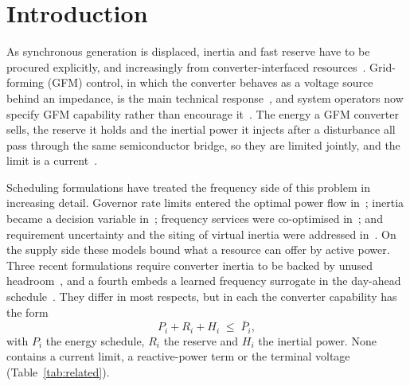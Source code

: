 
\section{Introduction}
\label{sec:intro}

As synchronous generation is displaced, inertia and fast reserve have to be
procured explicitly, and increasingly from converter-interfaced
resources~\cite{ulbig2014inertia,tielens2016inertia,milano2018lowinertia}.
Grid-forming (GFM) control, in which the converter behaves as a voltage source
behind an impedance, is the main technical
response~\cite{zhong2011synchronverter,rocabert2012control,dorfler2023control},
and system operators now specify GFM capability rather than encourage
it~\cite{matevosyan2019gfm,lin2020roadmap,entsoe2020gfm}. The energy a GFM
converter sells, the reserve it holds and the inertial power it injects after
a disturbance all pass through the same semiconductor bridge, so they are
limited jointly, and the limit is a current~\cite{yazdani2010vsc}.

Scheduling formulations have treated the frequency side of this problem in
increasing detail. Governor rate limits entered the optimal power flow
in~\cite{chavez2014governor}; inertia became a decision variable
in~\cite{teng2016stochastic}; frequency services were
co-optimised in~\cite{badesa2019simultaneous,trovato2019unit}; and
requirement uncertainty and the siting of virtual inertia were addressed
in~\cite{paturet2020stochastic,poolla2019placement}. On the supply side these
models bound what a resource can offer by active power. Three recent
formulations require converter inertia to be backed by unused
headroom~\cite{park2026inertia,jiang2025frequency,beigifard2026frequency},
and a fourth embeds a learned frequency surrogate in the day-ahead
schedule~\cite{jiang2026learning}. They differ in most respects, but in each
the converter capability has the form
%
\begin{equation}
  P_i + R_i + H_i \;\le\; \bar{P}_i ,
  \label{eq:box}
\end{equation}
%
with $P_i$ the energy schedule, $R_i$ the reserve and $H_i$ the inertial
power. None contains a current limit, a reactive-power term or the terminal
voltage (Table~\ref{tab:related}).

